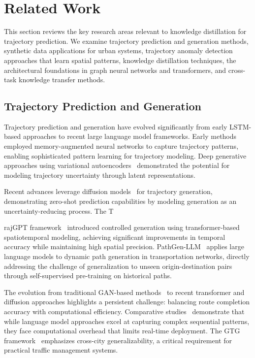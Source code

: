 \section{Related Work}
\label{sec:lit-review}

This section reviews the key research areas relevant to knowledge distillation for trajectory prediction. We examine trajectory prediction and generation methods, synthetic data applications for urban systems, trajectory anomaly detection approaches that learn spatial patterns, knowledge distillation techniques, the architectural foundations in graph neural networks and transformers, and cross-task knowledge transfer methods.

\subsection{Trajectory Prediction and Generation}
\label{sec:lit-traj-pred}

Trajectory prediction and generation have evolved significantly from early LSTM-based approaches to recent large language model frameworks. Early methods~\cite{liang2018memory} employed memory-augmented neural networks to capture trajectory patterns, enabling sophisticated pattern learning for trajectory modeling. Deep generative approaches using variational autoencoders~\cite{liuOnlineAnomalousTrajectory2020} demonstrated the potential for modeling trajectory uncertainty through latent representations.

Recent advances leverage diffusion models~\cite{chuSimulatingHumanMobility2024} for trajectory generation, demonstrating zero-shot prediction capabilities by modeling generation as an uncertainty-reducing process. The T

rajGPT framework~\cite{hsuTrajGPTControlledSynthetic2024} introduced controlled generation using transformer-based spatiotemporal modeling, achieving significant improvements in temporal accuracy while maintaining high spatial precision. PathGen-LLM~\cite{liPathGenLLMLargeLanguage} applies large language models to dynamic path generation in transportation networks, directly addressing the challenge of generalization to unseen origin-destination pairs through self-supervised pre-training on historical paths.

The evolution from traditional GAN-based methods~\cite{raoLSTMTrajGANDeepLearning2020} to recent transformer and diffusion approaches highlights a persistent challenge: balancing route completion accuracy with computational efficiency. Comparative studies~\cite{zhangEndtoendTrajectoryGeneration2025} demonstrate that while language model approaches excel at capturing complex sequential patterns, they face computational overhead that limits real-time deployment. The GTG framework~\cite{wangGTGGeneralizableTrajectory2025} emphasizes cross-city generalizability, a critical requirement for practical traffic management systems.

